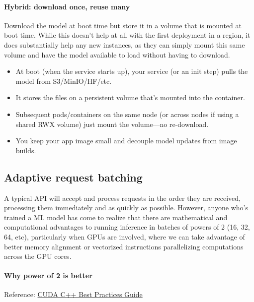 \paragraph{Hybrid: download once, reuse many}

Download the model at boot time but store it in a volume that is mounted at boot time. While this doesn't help at all with the first deployment in a region, it does substantially help any new instances, as they can simply mount this same volume and have the model available to load without having to download. 

\begin{itemize}
	\item At boot (when the service starts up), your service (or an init step) pulls the model from S3/MinIO/HF/etc.
	\item It stores the files on a persistent volume that's mounted into the container.
	\item Subsequent pods/containers on the same node (or across nodes if using a shared RWX volume) just mount the volume—no re-download.
	\item You keep your app image small and decouple model updates from image builds.
\end{itemize}


\subsection{Adaptive request batching}

A typical API will accept and process requests in the order they are received, processing them immediately and as quickly as possible. However, anyone who's trained a ML model has come to realize that there are mathematical and computational advantages to running inference in batches of powers of 2 (16, 32, 64, etc), particularly when GPUs are involved, where we can take advantage of better memory alignment or vectorized instructions parallelizing computations across the GPU cores.  

\paragraph{Why power of 2 is better}

Reference: \href{https://docs.nvidia.com/cuda/cuda-c-best-practices-guide/index.html}{CUDA C++ Best Practices Guide}

